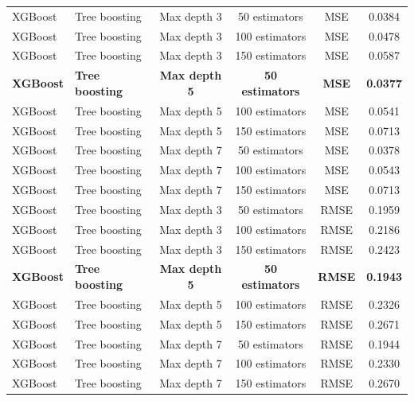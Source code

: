 \begin{landscape}
\begin{longtable}{llcccc}
XGBoost & Tree boosting & Max depth 3 & 50 estimators  & MSE  & 0.0384 \\
XGBoost & Tree boosting & Max depth 3 & 100 estimators & MSE  & 0.0478 \\
XGBoost & Tree boosting & Max depth 3 & 150 estimators & MSE  & 0.0587 \\
\textbf{XGBoost} & \textbf{Tree boosting} & \textbf{Max depth 5} & \textbf{50 estimators}  & \textbf{MSE}  & \textbf{0.0377} \\
XGBoost & Tree boosting & Max depth 5 & 100 estimators & MSE  & 0.0541 \\
XGBoost & Tree boosting & Max depth 5 & 150 estimators & MSE  & 0.0713 \\
XGBoost & Tree boosting & Max depth 7 & 50 estimators  & MSE  & 0.0378 \\
XGBoost & Tree boosting & Max depth 7 & 100 estimators & MSE  & 0.0543 \\
XGBoost & Tree boosting & Max depth 7 & 150 estimators & MSE  & 0.0713 \\


XGBoost & Tree boosting & Max depth 3 & 50 estimators  & RMSE & 0.1959 \\
XGBoost & Tree boosting & Max depth 3 & 100 estimators & RMSE & 0.2186 \\
XGBoost & Tree boosting & Max depth 3 & 150 estimators & RMSE & 0.2423 \\
\textbf{XGBoost} & \textbf{Tree boosting} & \textbf{Max depth 5} & \textbf{50 estimators}  & \textbf{RMSE} & \textbf{0.1943} \\
XGBoost & Tree boosting & Max depth 5 & 100 estimators & RMSE & 0.2326 \\
XGBoost & Tree boosting & Max depth 5 & 150 estimators & RMSE & 0.2671 \\
XGBoost & Tree boosting & Max depth 7 & 50 estimators  & RMSE & 0.1944 \\
XGBoost & Tree boosting & Max depth 7 & 100 estimators & RMSE & 0.2330 \\
XGBoost & Tree boosting & Max depth 7 & 150 estimators & RMSE & 0.2670 \\

\end{longtable}
\end{landscape}